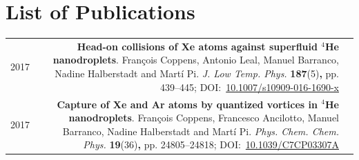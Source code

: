 \chapter{List of Publications}
	\hspace{-30pt} %
	\begin{tabular}{l!{\VRule}Rc}
		2017 & \textbf{Head-on collisions of {Xe} atoms against superfluid $^4${H}e nanodroplets}. Fran\c{c}ois Coppens, Antonio Leal, Manuel Barranco, Nadine Halberstadt and Mart\'{i} Pi. \emph{J. Low Temp. Phys.} \textbf{187}(5)\textbf{,} pp. 439--445; DOI:~\href{https://doi.org/10.1007/s10909-016-1690-x}{10.1007/s10909-016-1690-x}&\vspace{20pt}\\
		2017 & \textbf{Capture of Xe and Ar atoms by quantized vortices in $^4$He nanodroplets}. Fran\c{c}ois Coppens, Francesco Ancilotto, Manuel Barranco, Nadine Halberstadt and Mart\'{i} Pi. \emph{Phys. Chem. Chem. Phys.} \textbf{19}(36)\textbf{,} pp. 24805--24818; DOI:~\href{http://dx.doi.org/10.1039/C7CP03307A}{10.1039/C7CP03307A}&\vspace{20pt}\\

\end{tabular}
